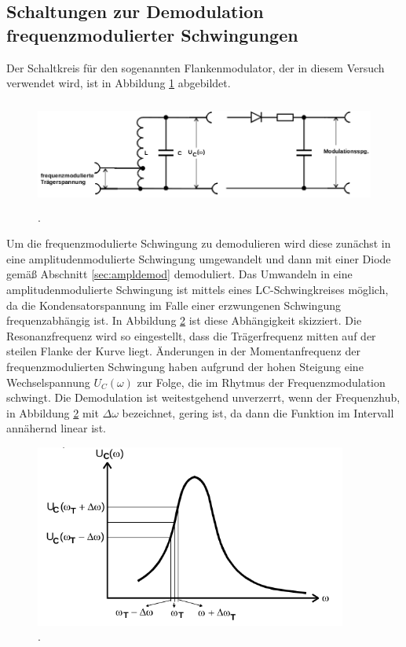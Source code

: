 \subsection{Schaltungen zur Demodulation frequenzmodulierter Schwingungen}

Der Schaltkreis für den sogenannten Flankenmodulator, der in diesem Versuch verwendet wird,
ist in Abbildung \ref{fig:flankendemodulator} abgebildet.

\begin{figure}
  \centering
  \includegraphics[height=3.5cm]{JasperErsterSchultag/flankendemodulator.png}
  \caption{\cite{anleitung}.}
  \label{fig:flankendemodulator}
\end{figure}

Um die frequenzmodulierte Schwingung zu demodulieren
wird diese zunächst in eine amplitudenmodulierte Schwingung umgewandelt und dann mit einer Diode gemäß Abschnitt \ref{sec:ampldemod}
demoduliert. Das Umwandeln in eine amplitudenmodulierte Schwingung ist mittels eines LC-Schwingkreises möglich,
da die Kondensatorspannung im Falle einer erzwungenen Schwingung frequenzabhängig ist. In Abbildung
\ref{fig:freqabh} ist diese Abhängigkeit skizziert. Die Resonanzfrequenz wird so eingestellt, dass die Trägerfrequenz
mitten auf der steilen Flanke der Kurve liegt. Änderungen in der Momentanfrequenz der frequenzmodulierten Schwingung
haben aufgrund der hohen Steigung eine Wechselspannung $U_C(\omega)$ zur Folge, die im Rhytmus der Frequenzmodulation
schwingt. Die Demodulation ist weitestgehend unverzerrt, wenn der Frequenzhub, in Abbildung \ref{fig:freqabh} mit
$\Delta \omega$ bezeichnet, gering ist, da dann die Funktion im Intervall annähernd linear ist.

\begin{figure}
  \centering
  \includegraphics[height=6cm]{JasperErsterSchultag/freqabh.png}
  \caption{\cite{anleitung}.}
  \label{fig:freqabh}
\end{figure}







\cite{anleitung}
